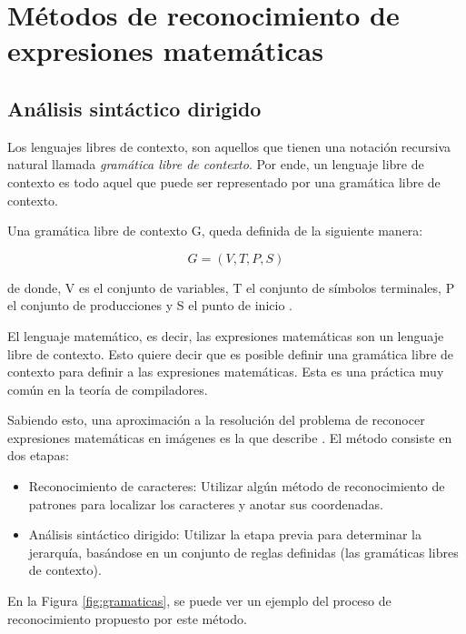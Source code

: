 
\section{Métodos de reconocimiento de expresiones matemáticas}
\subsection{Análisis sintáctico dirigido}
Los lenguajes libres de contexto, son aquellos que tienen una notación recursiva natural llamada \textit{gramática libre de contexto}. Por ende, un lenguaje libre de contexto es todo aquel que puede ser representado por una gramática libre de contexto.

Una gramática libre de contexto G, queda definida de la siguiente manera:

\begin{equation}
G = (V, T, P, S)
\end{equation}

de donde, V es el conjunto de variables, T el conjunto de símbolos terminales, P el conjunto de producciones y S el punto de inicio \cite{automata}.

El lenguaje matemático, es decir, las expresiones matemáticas son un lenguaje libre de contexto. Esto quiere decir que es posible definir una gramática libre de contexto para definir a las expresiones matemáticas. Esta es una práctica muy común en la teoría de compiladores.

Sabiendo esto, una aproximación a la resolución del problema de reconocer expresiones matemáticas en imágenes es la que describe \cite{gramaticasAnderson}. El método consiste en dos etapas:

\begin{itemize}
	\item Reconocimiento de caracteres: Utilizar algún método de reconocimiento de patrones para localizar los caracteres y anotar sus coordenadas. 
	\item Análisis sintáctico dirigido: Utilizar la etapa previa para determinar la jerarquía, basándose en un conjunto de reglas definidas (las gramáticas libres de contexto).
\end{itemize}

En la Figura \ref{fig:gramaticas}, se puede ver un ejemplo del proceso de reconocimiento propuesto por este método.

